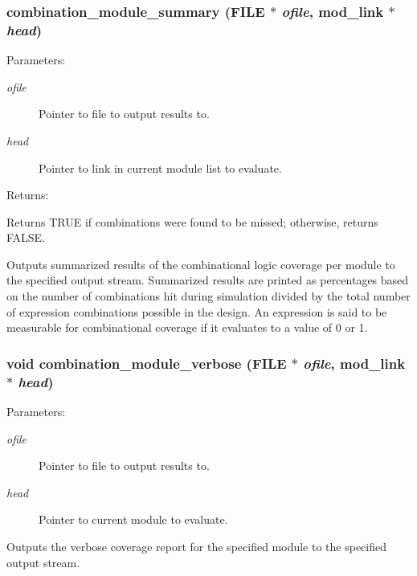 \subsubsection{ combination\_\-module\_\-summary (FILE $\ast$ {\em ofile}, {\bf mod\_\-link} $\ast$ {\em head})}\label{comb_8c_a10}


\begin{Desc}
\item[Parameters: ]\par
\begin{description}
\item[{\em 
ofile}]Pointer to file to output results to. \item[{\em 
head}]Pointer to link in current module list to evaluate.\end{description}
\end{Desc}
\begin{Desc}
\item[Returns: ]\par
Returns TRUE if combinations were found to be missed; otherwise, returns FALSE.\end{Desc}
Outputs summarized results of the combinational logic coverage per module to the specified output stream. Summarized results are printed as  percentages based on the number of combinations hit during simulation  divided by the total number of expression combinations possible in the  design. An expression is said to be measurable for combinational coverage  if it evaluates to a value of 0 or 1. 
\subsubsection{\setlength{\rightskip}{0pt plus 5cm}void combination\_\-module\_\-verbose (FILE $\ast$ {\em ofile}, {\bf mod\_\-link} $\ast$ {\em head})}\label{comb_8c_a20}


\begin{Desc}
\item[Parameters: ]\par
\begin{description}
\item[{\em 
ofile}]Pointer to file to output results to. \item[{\em 
head}]Pointer to current module to evaluate.\end{description}
\end{Desc}
Outputs the verbose coverage report for the specified module to the specified output stream. 
